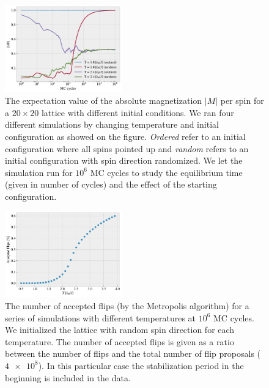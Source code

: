 \documentclass[%
 reprint,
nofootinbib,
aps,
]{revtex4-1}
\begin{document}
\hfill \linebreak

 \begin{figure}[H]  
  \centering
  \includegraphics[width=0.45\textwidth]{figures/equilibrium_magnetization.pdf}
  \caption{The expectation value of the absolute magnetization $|M|$ per spin for a $20\times20$ lattice with different initial conditions. We ran four different simulations by changing temperature and initial configuration as showed on the figure. \textit{Ordered} refer to an initial configuration where all spins pointed up and \textit{random} refers to an initial configuration with spin direction randomized. We let the simulation run for $10^6$ MC cycles to study the equilibrium time (given in number of cycles) and the effect of the starting configuration.}
  \label{fig:equilibrium_magnetization}
\end{figure}

 \begin{figure}[H]  
  \centering
  \includegraphics[width=0.45\textwidth]{figures/accepted_flips.pdf}
  \caption{The number of accepted flips (by the Metropolis algorithm) for a series of simulations with different temperatures at $10^6$ MC cycles. We initialized the lattice with random spin direction for each temperature. The number of accepted flips is given as a ratio between the number of flips and the total number of flip proposals ($\num{4e8}$). In this particular case the stabilization period in the beginning is included in the data.}
  \label{fig:accepted_spins}
\end{figure}


\clearpage
\end{document}
